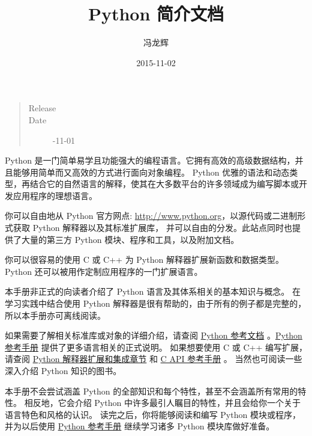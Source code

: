 \documentclass[a4paper,10pt,english]{sphinxmanual}
\title{Python 简介文档}
\date{2015-11-02}
\author{冯龙辉}
\begin{document}
\maketitle
\tableofcontents
{}\label{index::doc}

\begin{quote}\begin{description}
\item[{Release}] 

\item[{Date}] -11-01

\end{description}\end{quote}

Python 是一门简单易学且功能强大的编程语言。它拥有高效的高级数据结构，并且能够用简单而又高效的方式进行面向对象编程。
Python 优雅的语法和动态类型，再结合它的自然语言的解释，使其在大多数平台的许多领域成为编写脚本或开发应用程序的理想语言。

你可以自由地从 Python 官方网点: \href{http://www.python.org}{http://www.python.org}，以源代码或二进制形式获取 Python 解释器以及其标准扩展库，
并可以自由的分发。此站点同时也提供了大量的第三方 Python 模块、程序和工具，以及附加文档。

你可以很容易的使用 C 或 C++ 为 Python 解释器扩展新函数和数据类型。
Python 还可以被用作定制应用程序的一门扩展语言。

本手册非正式的向读者介绍了 Python 语言及其体系相关的基本知识与概念。
在学习实践中结合使用 Python 解释器是很有帮助的，由于所有的例子都是完整的，所以本手册亦可离线阅读。

如果需要了解相关标准库或对象的详细介绍，请查阅 \href{https://docs.python.org/3/library/index.html\#library-index}{Python 参考文档} 。\href{https://docs.python.org/3/reference/index.html\#reference-index}{Python 参考手册} 提供了更多语言相关的正式说明。
如果想要使用 C 或 C++ 编写扩展，请查阅 \href{https://docs.python.org/3/extending/index.html\#extending-index}{Python 解释器扩展和集成章节} 和 \href{https://docs.python.org/3/c-api/index.html\#c-api-index}{C API 参考手册} 。
当然也可阅读一些深入介绍 Python 知识的图书。

本手册不会尝试涵盖 Python 的全部知识和每个特性，甚至不会涵盖所有常用的特性。
相反地，它会介绍 Python 中许多最引人瞩目的特性，并且会给你一个关于语言特色和风格的认识。
读完之后，你将能够阅读和编写 Python 模块或程序，并为以后使用
\href{https://docs.python.org/3/reference/index.html\#reference-index}{Python 参考手册} 继续学习诸多 Python 模块库做好准备。
\end{document}
